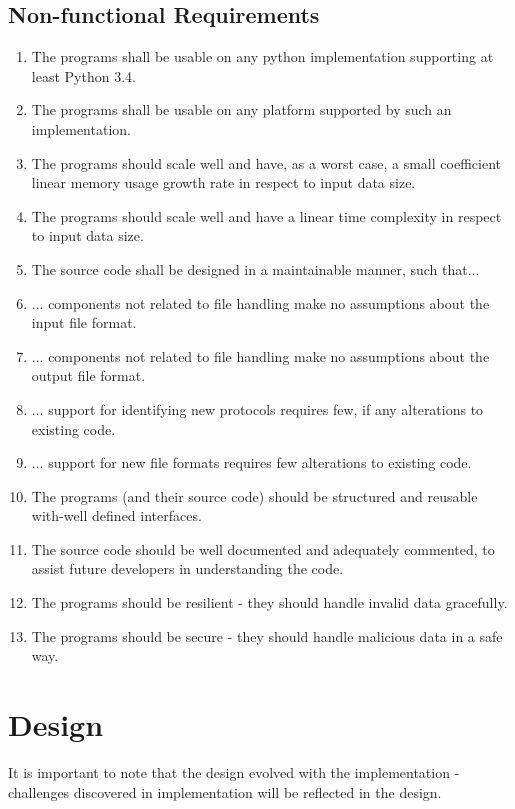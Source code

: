 \documentclass[10pt,a4paper,notitlepage]{report}
\begin{document}
\pagebreak
\section{Non-functional Requirements}
\begin{enumerate}[label=\bfseries NFR\arabic*:]
\item \label{nfr:1} The programs shall be usable on any python implementation supporting at least Python 3.4.
\item \label{nfr:2} The programs shall be usable on any platform supported by such an implementation.
\item \label{nfr:3} The programs should scale well and have, as a worst case, a small coefficient linear memory usage growth rate in respect to input data size.
\item \label{nfr:4} The programs should scale well and have a linear time complexity in respect to input data size.
\item \label{nfr:5} The source code shall be designed in a maintainable manner, such that...
\item \label{nfr:6} ... components not related to file handling make no assumptions about the input file format.
\item \label{nfr:7} ... components not related to file handling make no assumptions about the output file format.
\item \label{nfr:8} ... support for identifying new protocols requires few, if any alterations to existing code.
\item \label{nfr:9} ... support for new file formats requires few alterations to existing code.
\item \label{nfr:10} The programs (and their source code) should be structured and reusable with-well defined interfaces.
\item \label{nfr:11} The source code should be well documented and adequately commented, to assist future developers in understanding the code.
\item \label{nfr:12} The programs should be resilient - they should handle invalid data gracefully.
\item \label{nfr:13} The programs should be secure - they should handle malicious data in a safe way.
\end{enumerate}

\chapter{Design}
It is important to note that the design evolved with the implementation - challenges discovered in implementation will be reflected in the design.
\end{document}
